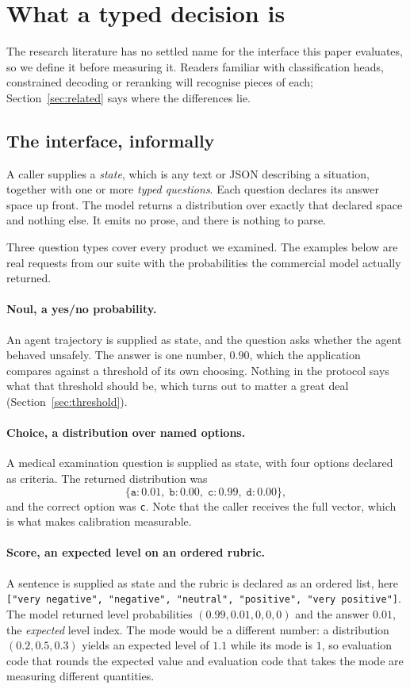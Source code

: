 \section{What a typed decision is}
\label{sec:typed}

The research literature has no settled name for the interface this paper
evaluates, so we define it before measuring it. Readers familiar with
classification heads, constrained decoding or reranking will recognise pieces of
each; Section~\ref{sec:related} says where the differences lie.

\subsection{The interface, informally}

A caller supplies a \emph{state}, which is any text or JSON describing a
situation, together with one or more \emph{typed questions}. Each question
declares its answer space up front. The model returns a distribution over exactly
that declared space and nothing else. It emits no prose, and there is nothing to
parse.

Three question types cover every product we examined. The examples below are real
requests from our suite with the probabilities the commercial model actually
returned.

\paragraph{Noul, a yes/no probability.} An agent trajectory is supplied as state,
and the question asks whether the agent behaved unsafely. The answer is one
number, $0.90$, which the application compares against a threshold of its own
choosing. Nothing in the protocol says what that threshold should be, which turns
out to matter a great deal (Section~\ref{sec:threshold}).

\paragraph{Choice, a distribution over named options.} A medical examination
question is supplied as state, with four options declared as criteria. The
returned distribution was
\[
  \{\texttt{a}: 0.01,\; \texttt{b}: 0.00,\; \texttt{c}: 0.99,\; \texttt{d}: 0.00\},
\]
and the correct option was \texttt{c}. Note that the caller receives the full
vector, which is what makes calibration measurable.

\paragraph{Score, an expected level on an ordered rubric.} A sentence is supplied
as state and the rubric is declared as an ordered list, here
\texttt{["very negative", "negative", "neutral", "positive", "very positive"]}.
The model returned level probabilities $(0.99, 0.01, 0, 0, 0)$ and the answer
$0.01$, the \emph{expected} level index. The mode would be a different number: a distribution $(0.2, 0.5, 0.3)$ yields an expected
level of $1.1$ while its mode is $1$, so evaluation code that rounds the expected
value and evaluation code that takes the mode are measuring different quantities.

